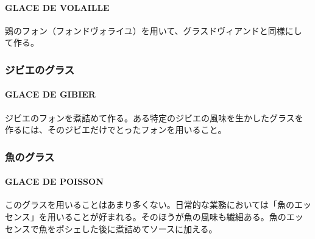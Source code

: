 \documentclass[twoside,12Q,b5j]{escoffierltjsbook}
\newenvironment{recette}{\begin{multicols}{2}}{\end{multicols}}
\begin{document}
\begin{recette}
\paragraph{GLACE DE VOLAILLE}\label{glace-de-volaille}


鶏のフォン（フォンドヴォライユ）を用いて、グラスドヴィアンドと同様にし
て作る。

\vspace*{2\zw}

\subsubsection{ジビエのグラス}\label{ux30b8ux30d3ux30a8ux306eux30b0ux30e9ux30b9}

\paragraph{GLACE DE GIBIER}\label{glace-de-gibier}


ジビエのフォンを煮詰めて作る。ある特定のジビエの風味を生かしたグラスを
作るには、そのジビエだけでとったフォンを用いること。

\vspace*{2\zw}

\subsubsection{魚のグラス}\label{ux9b5aux306eux30b0ux30e9ux30b9}

\paragraph{GLACE DE POISSON}\label{glace-de-poisson}


このグラスを用いることはあまり多くない。日常的な業務においては「魚のエッ
センス」を用いることが好まれる。そのほうが魚の風味も繊細ある。魚のエッ
センスで魚をポシェした後に煮詰めてソースに加える。

\end{recette}
\end{document}
